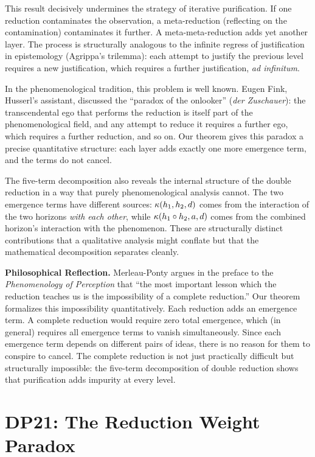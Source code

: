 This result decisively undermines the strategy of iterative purification.
If one reduction contaminates the observation, a meta-reduction
(reflecting on the contamination) contaminates it further. A
meta-meta-reduction adds yet another layer. The process is structurally
analogous to the infinite regress of justification in epistemology
(Agrippa's trilemma): each attempt to justify the previous level
requires a new justification, which requires a further justification,
\textit{ad infinitum}.

In the phenomenological tradition, this problem is well known. Eugen
Fink, Husserl's assistant, discussed the ``paradox of the onlooker''
(\textit{der Zuschauer}): the transcendental ego that performs the
reduction is itself part of the phenomenological field, and any attempt
to reduce it requires a further ego, which requires a further reduction,
and so on. Our theorem gives this paradox a precise quantitative
structure: each layer adds exactly one more emergence term, and the
terms do not cancel.

The five-term decomposition also reveals the internal structure of the
double reduction in a way that purely phenomenological analysis cannot.
The two emergence terms have different sources: $\kappa(h_1, h_2, d)$
comes from the interaction of the two horizons \emph{with each other},
while $\kappa(h_1 \circ h_2, a, d)$ comes from the combined
horizon's interaction with the phenomenon. These are structurally
distinct contributions that a qualitative analysis might conflate but
that the mathematical decomposition separates cleanly.

\begin{reflectionbox}
\textbf{Philosophical Reflection.}
Merleau-Ponty argues in the preface to the \textit{Phenomenology of
Perception} that ``the most important lesson which the reduction teaches
us is the impossibility of a complete reduction.'' Our theorem
formalizes this impossibility quantitatively. Each reduction adds an
emergence term. A complete reduction would require zero total emergence,
which (in general) requires all emergence terms to vanish simultaneously.
Since each emergence term depends on different pairs of ideas, there is
no reason for them to conspire to cancel. The complete reduction is not
just practically difficult but structurally impossible: the five-term
decomposition of double reduction shows that purification adds impurity
at every level.
\end{reflectionbox}

\section{DP21: The Reduction Weight Paradox}


